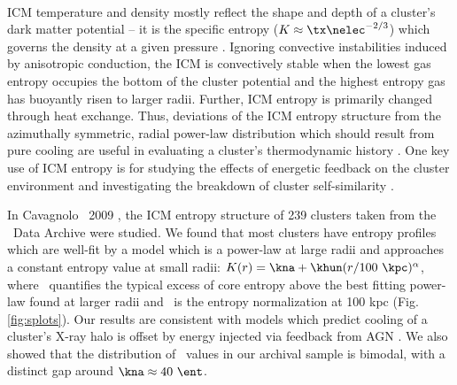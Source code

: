 \documentclass[letterpaper,12pt]{article}
\begin{document}
\\
\indent ICM temperature and density mostly reflect the shape and depth
of a cluster's dark matter potential -- it is the specific entropy ($K
\approx \tx \nelec^{-2/3}$) which governs the density at a given
pressure \citep{voitbryan}. Ignoring convective instabilities induced
by anisotropic conduction, the ICM is convectively stable when the
lowest gas entropy occupies the bottom of the cluster potential and
the highest entropy gas has buoyantly risen to larger radii. Further,
ICM entropy is primarily changed through heat exchange. Thus,
deviations of the ICM entropy structure from the azimuthally
symmetric, radial power-law distribution which should result from pure
cooling are useful in evaluating a cluster's thermodynamic history
\citep{vkb05}. One key use of ICM entropy is for studying the effects
of energetic feedback on the cluster environment and investigating the
breakdown of cluster self-similarity \citep{agnframework}.

In Cavagnolo \etal\ 2009 \citep{accept}, the ICM entropy structure of
239 clusters taken from the \chandra\ Data Archive were studied. We
found that most clusters have entropy profiles which are well-fit by a
model which is a power-law at large radii and approaches a constant
entropy value at small radii: $K(r) = \kna + \khun (r/100
~\kpc)^{\alpha}$, where \kna\ quantifies the typical excess of core
entropy above the best fitting power-law found at larger radii and
\khun\ is the entropy normalization at 100 kpc
(Fig. \ref{fig:splots}). Our results are consistent with models which
predict cooling of a cluster's X-ray halo is offset by energy injected
via feedback from AGN \citep[\eg][]{agnframework}. We also showed that
the distribution of \kna\ values in our archival sample is bimodal,
with a distinct gap around $\kna \approx 40 ~\ent$.
\end{document}
